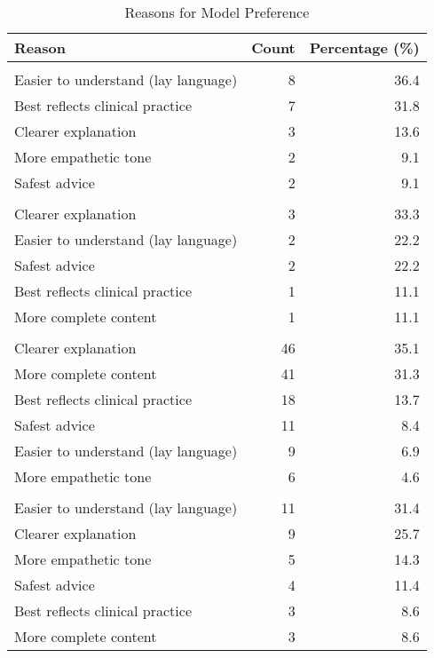 \documentclass[
  11pt]{report}
\begin{document}
\begin{table}
\caption*{
{\large Reasons for Model Preference}
} 
\fontsize{12.0pt}{14.4pt}\selectfont
\begin{tabular*}{\linewidth}{@{\extracolsep{\fill}}lrr}
\toprule
Reason & Count & Percentage (\%) \\ 
\midrule\addlinespace[2.5pt]
\multicolumn{3}{l}{{\bfseries Anthropic}} \\[2.5pt] 
\midrule\addlinespace[2.5pt]
Easier to understand (lay language) & 8 & 36.4 \\ 
Best reflects clinical practice & 7 & 31.8 \\ 
Clearer explanation & 3 & 13.6 \\ 
More empathetic tone & 2 & 9.1 \\ 
Safest advice & 2 & 9.1 \\ 
\midrule\addlinespace[2.5pt]
\multicolumn{3}{l}{{\bfseries Deepseek}} \\[2.5pt] 
\midrule\addlinespace[2.5pt]
Clearer explanation & 3 & 33.3 \\ 
Easier to understand (lay language) & 2 & 22.2 \\ 
Safest advice & 2 & 22.2 \\ 
Best reflects clinical practice & 1 & 11.1 \\ 
More complete content & 1 & 11.1 \\ 
\midrule\addlinespace[2.5pt]
\multicolumn{3}{l}{{\bfseries Google}} \\[2.5pt] 
\midrule\addlinespace[2.5pt]
Clearer explanation & 46 & 35.1 \\ 
More complete content & 41 & 31.3 \\ 
Best reflects clinical practice & 18 & 13.7 \\ 
Safest advice & 11 & 8.4 \\ 
Easier to understand (lay language) & 9 & 6.9 \\ 
More empathetic tone & 6 & 4.6 \\ 
\midrule\addlinespace[2.5pt]
\multicolumn{3}{l}{{\bfseries Openai}} \\[2.5pt] 
\midrule\addlinespace[2.5pt]
Easier to understand (lay language) & 11 & 31.4 \\ 
Clearer explanation & 9 & 25.7 \\ 
More empathetic tone & 5 & 14.3 \\ 
Safest advice & 4 & 11.4 \\ 
Best reflects clinical practice & 3 & 8.6 \\ 
More complete content & 3 & 8.6 \\ 

\end{tabular*}
\end{table}
\end{document}
